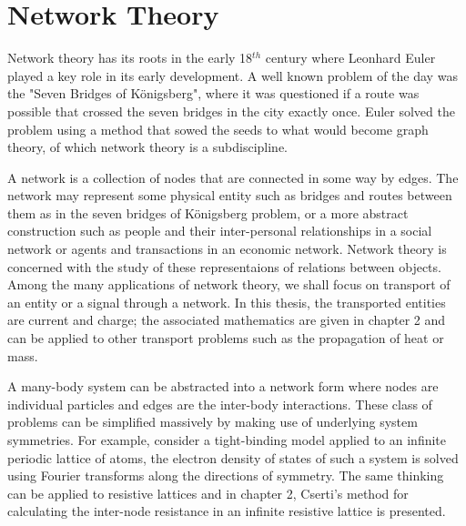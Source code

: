 \section{Network Theory}
\label{Sec: Network Theory}
Network theory has its roots in the early 18$^{th}$ century where Leonhard Euler played a key role in its early development. A well known problem of the day was the "Seven Bridges of K\"onigsberg", where it was questioned if a route was possible that crossed the seven bridges in the city exactly once. Euler solved the problem using a method that sowed the seeds to what would become graph theory\cite{guichard2017}, of which network theory is a subdiscipline\cite{pozrikidis}. 

A network is a collection of nodes that are connected in some way by edges. The network may represent some physical entity such as bridges and routes between them as in the seven bridges of K\"onigsberg problem, or a more abstract construction such as people and their inter-personal relationships in a social network or agents and transactions in an economic network\cite{pozrikidis}. Network theory is concerned with the study of these representaions of relations between objects\cite{pozrikidis}. Among the many applications of network theory, we shall focus on transport of an entity or a signal through a network. In this thesis, the transported entities are current and charge; the associated mathematics are given in chapter 2 and can be applied to other transport problems such as the propagation of heat or mass. 

A many-body system can be abstracted into a network form where nodes are individual particles and edges are the inter-body interactions. These class of problems can be simplified massively by making use of underlying system symmetries. For example, consider a tight-binding model applied to an infinite periodic lattice of atoms, the electron density of states of such a system is solved using Fourier transforms along the directions of symmetry\cite{datta2005}. The same thinking can be applied to resistive lattices and in chapter 2, Cserti's method for calculating the inter-node resistance in an infinite resistive lattice is presented\cite{cserti2000}. 

